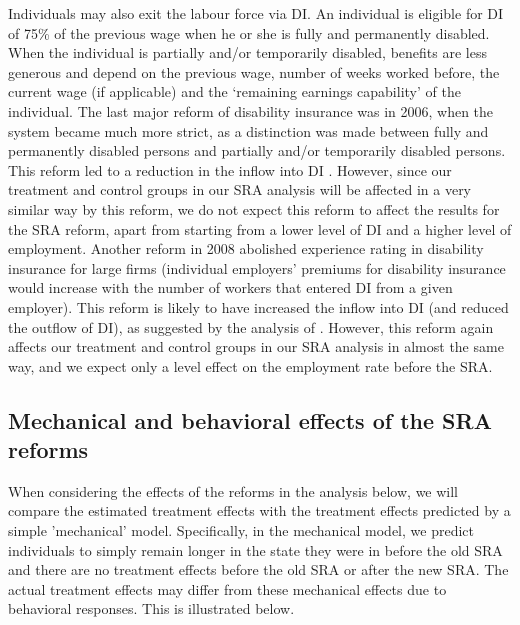 \documentclass[12pt,a4paper]{article}
\begin{document}
Individuals may also exit the labour force via DI. An individual is eligible for DI of 75\% of the previous wage when he or she is fully and permanently disabled. When the individual is partially and/or temporarily disabled, benefits are less generous and depend on the previous wage, number of weeks worked before, the current wage (if applicable) and the `remaining earnings capability' of the individual. The last major reform of disability insurance was in 2006, when the system became much more strict, as a distinction was made between fully and permanently disabled persons and partially and/or temporarily disabled persons. This reform led to a reduction in the inflow into DI \citep[see e.g.][]{koning_lindeboom_2015}. However, since our treatment and control groups in our SRA analysis will be affected in a very similar way by this reform, we do not expect this reform to affect the results for the SRA reform, apart from starting from a lower level of DI and a higher level of employment. Another reform in 2008 abolished experience rating in disability insurance for large firms (individual employers' premiums for disability insurance would increase with the number of workers that entered DI from a given employer). This reform is likely to have increased the inflow into DI (and reduced the outflow of DI), as suggested by the analysis of \cite{groot_koning_2016}. However, this reform again affects our treatment and control groups in our SRA analysis in almost the same way, and we expect only a level effect on the employment rate before the SRA. 

\subsection{Mechanical and behavioral effects of the SRA reforms}\label{mechanical_model}

When considering the effects of the reforms in the analysis below, we will compare the estimated treatment effects with the treatment effects predicted by a simple 'mechanical' model. Specifically, in the mechanical model, we predict individuals to simply remain longer in the state they were in before the old SRA and there are no treatment effects before the old SRA or after the new SRA. The actual treatment effects may differ from these mechanical effects due to behavioral responses. This is illustrated below. 
\end{document}

